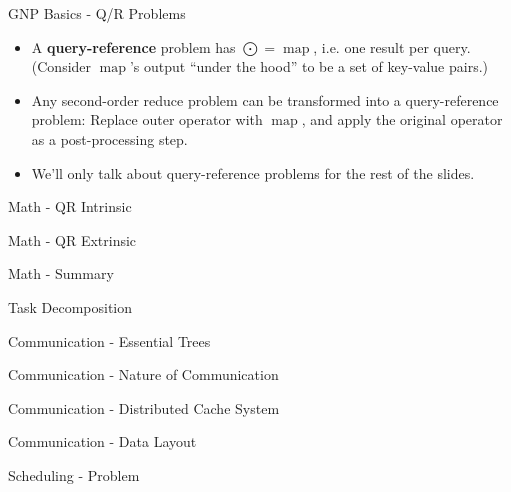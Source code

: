 \documentclass[pdf,colorBG,slideColor]{prosper}
\DeclareMathOperator*{\map}{map}
\newcommand{\defterm}[1]{{\bf #1}}
\begin{document}
\begin{slide}{GNP Basics - Q/R Problems}
  \begin{itemize}
    \item A \defterm{query-reference} problem has $\bigodot = \map$, i.e. one result per query.
    (Consider $\map$'s output ``under the hood'' to be a set of key-value pairs.)
    \item Any second-order reduce problem can be transformed into a query-reference problem:
    Replace outer operator with $\map$, and apply the original operator as a post-processing step.
    \item We'll only talk about query-reference problems for the rest of the slides.
  \end{itemize}
\end{slide}

\begin{slide}{Math - QR Intrinsic}
  
\end{slide}

\begin{slide}{Math - QR Extrinsic}
\end{slide}

\begin{slide}{Math - Summary}
\end{slide}

\begin{slide}{Task Decomposition}
\end{slide}

\begin{slide}{Communication - Essential Trees}
\end{slide}

\begin{slide}{Communication - Nature of Communication}
\end{slide}

\begin{slide}{Communication - Distributed Cache System}
\end{slide}

\begin{slide}{Communication - Data Layout}
\end{slide}

\begin{slide}{Scheduling - Problem}
\end{slide}
\end{document}
